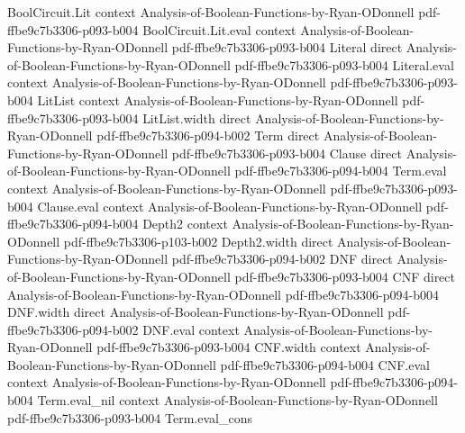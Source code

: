 \begin{theorem}
\leanok
{}
\proofstep
  {BoolCircuit.Lit}
  {context}
  {Analysis-of-Boolean-Functions-by-Ryan-ODonnell}
  {pdf-ffbe9c7b3306-p093-b004}
\proofstep
  {BoolCircuit.Lit.eval}
  {context}
  {Analysis-of-Boolean-Functions-by-Ryan-ODonnell}
  {pdf-ffbe9c7b3306-p093-b004}
\proofstep
  {Literal}
  {direct}
  {Analysis-of-Boolean-Functions-by-Ryan-ODonnell}
  {pdf-ffbe9c7b3306-p093-b004}
\proofstep
  {Literal.eval}
  {context}
  {Analysis-of-Boolean-Functions-by-Ryan-ODonnell}
  {pdf-ffbe9c7b3306-p093-b004}
\proofstep
  {LitList}
  {context}
  {Analysis-of-Boolean-Functions-by-Ryan-ODonnell}
  {pdf-ffbe9c7b3306-p093-b004}
\proofstep
  {LitList.width}
  {direct}
  {Analysis-of-Boolean-Functions-by-Ryan-ODonnell}
  {pdf-ffbe9c7b3306-p094-b002}
\proofstep
  {Term}
  {direct}
  {Analysis-of-Boolean-Functions-by-Ryan-ODonnell}
  {pdf-ffbe9c7b3306-p093-b004}
\proofstep
  {Clause}
  {direct}
  {Analysis-of-Boolean-Functions-by-Ryan-ODonnell}
  {pdf-ffbe9c7b3306-p094-b004}
\proofstep
  {Term.eval}
  {context}
  {Analysis-of-Boolean-Functions-by-Ryan-ODonnell}
  {pdf-ffbe9c7b3306-p093-b004}
\proofstep
  {Clause.eval}
  {context}
  {Analysis-of-Boolean-Functions-by-Ryan-ODonnell}
  {pdf-ffbe9c7b3306-p094-b004}
\proofstep
  {Depth2}
  {context}
  {Analysis-of-Boolean-Functions-by-Ryan-ODonnell}
  {pdf-ffbe9c7b3306-p103-b002}
\proofstep
  {Depth2.width}
  {direct}
  {Analysis-of-Boolean-Functions-by-Ryan-ODonnell}
  {pdf-ffbe9c7b3306-p094-b002}
\proofstep
  {DNF}
  {direct}
  {Analysis-of-Boolean-Functions-by-Ryan-ODonnell}
  {pdf-ffbe9c7b3306-p093-b004}
\proofstep
  {CNF}
  {direct}
  {Analysis-of-Boolean-Functions-by-Ryan-ODonnell}
  {pdf-ffbe9c7b3306-p094-b004}
\proofstep
  {DNF.width}
  {direct}
  {Analysis-of-Boolean-Functions-by-Ryan-ODonnell}
  {pdf-ffbe9c7b3306-p094-b002}
\proofstep
  {DNF.eval}
  {context}
  {Analysis-of-Boolean-Functions-by-Ryan-ODonnell}
  {pdf-ffbe9c7b3306-p093-b004}
\proofstep
  {CNF.width}
  {context}
  {Analysis-of-Boolean-Functions-by-Ryan-ODonnell}
  {pdf-ffbe9c7b3306-p094-b004}
\proofstep
  {CNF.eval}
  {context}
  {Analysis-of-Boolean-Functions-by-Ryan-ODonnell}
  {pdf-ffbe9c7b3306-p094-b004}
\proofstep
  {Term.eval_nil}
  {context}
  {Analysis-of-Boolean-Functions-by-Ryan-ODonnell}
  {pdf-ffbe9c7b3306-p093-b004}
\proofstep
  {Term.eval_cons}

\end{theorem}
